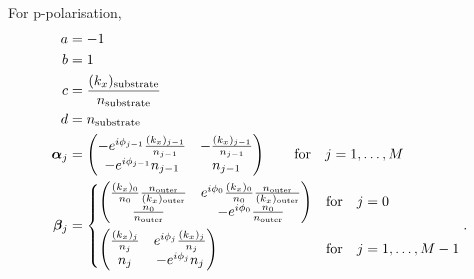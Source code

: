 \documentclass[]{article}
\begin{document}
	For p-polarisation,
	\begin{align}
		a&=-1\\
		b&=1\\
		c&=\frac{(k_x)_\text{substrate}}{n_\text{substrate}}\\
		d&=n_{\text{substrate}}\\
		\bm{\alpha}_j&=
		\begin{pmatrix}
			-e^{i\phi_{j-1}}\frac{(k_x)_{j-1}}{n_{j-1}}&-\frac{(k_x)_{j-1}}{n_{j-1}}\\
			-e^{i\phi_{j-1}}n_{j-1}&n_{j-1}
		\end{pmatrix}\quad\quad\text{for}\quad j=1,\dots,M\\
		\bm{\beta}_j&=
		\begin{dcases}
			\begin{pmatrix}
				\frac{(k_x)_0}{n_0}\frac{n_\text{outer}}{(k_x)_\text{outer}}&e^{i\phi_0}\frac{(k_x)_0}{n_0}\frac{n_\text{outer}}{(k_x)_\text{outer}}\\
				\frac{n_0}{n_\text{outer}}&-e^{i\phi_0}\frac{n_0}{n_\text{outer}}
			\end{pmatrix}&\text{for}\quad j=0\\
			\begin{pmatrix}
				\frac{(k_x)_j}{n_j}&e^{i\phi_j}\frac{(k_x)_j}{n_j}\\
				n_j&-e^{i\phi_j}n_j
			\end{pmatrix}&\text{for}\quad j=1,\dots,M-1
		\end{dcases}.
	\end{align}
	
\end{document}
